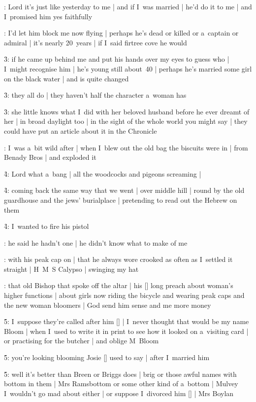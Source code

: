 :
Lord it's just like yesterday to me |
and if I~was married |
he'd do it to me |
and I~promised him yes faithfully

:
I'd let him block me now flying |
perhaps he's dead or killed or a~captain or admiral |
it's nearly 20~years |
if I~said firtree cove he would

\f3:
if he came up behind me and put his hands over my eyes to guess who |
I~might recognise him |
he's young still about~40 |
perhaps he's married some girl on the black water |
and is quite changed

\f3:
they all do |
they haven't half the character a~woman has

\f3:
she little knows what I~did with her beloved husband before he ever dreamt of her |
in broad daylight too |
in the sight of the whole world you might say |
they could have put an article about it in the Chronicle

:
I~was a~bit wild after |
when I~blew out the old bag the biscuits were in |
from Benady Bros |
and exploded it

\f4:
Lord what a~bang |
all the woodcocks and pigeons screaming |

\f4:
coming back the same way that we went |
over middle hill |
round by the old guardhouse and the jews' burialplace |
pretending to read out the Hebrew on them

\f4:
I~wanted to fire his pistol

:
he said he hadn't one |
he didn't know what to make of me

:
with his peak cap on |
that he always wore crooked as often as I~settled it straight |
H~M~S Calypso |
swinging my hat

:
that old Bishop that spoke off the altar |
his [\bishop] long preach about woman's higher functions |
about girls now riding the bicycle and wearing peak caps and the new woman bloomers |
God send him sense and me more money

\f5:
I~suppose they're called after him [\bloom] |
I~never thought that would be my name Bloom |
when I~used to write it in print to see how it looked on a~visiting card |
or practising for the butcher |
and oblige M~Bloom

\f5:
you're looking blooming Josie [\josie] used to say |
after I~married him

\f5:
well it's better than Breen or Briggs does |
brig or those awful names with bottom in them |
Mrs Ramsbottom or some other kind of a~bottom |
Mulvey I~wouldn't go mad about either |
or suppose I~divorced him [\bloom] |
Mrs Boylan

